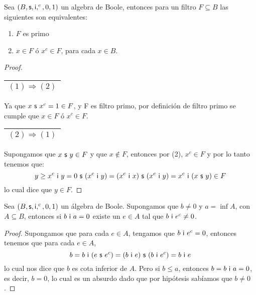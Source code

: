   \begin{lemma} \label{lemma_26}
    \PN Sea $(B, \mathsf{s}, \mathsf{i}, ^{c}, 0, 1)$ un algebra de Boole, entonces para un filtro $F \subseteq B$ las siguientes son equivalentes:
    \begin{enumerate}[(1)]
      \item $F$ es primo
      \item $x \in F$ ó $x^{c} \in F$, para cada $x \in B$.
    \end{enumerate}
  \end{lemma}
  \begin{proof}
    \begin{tabular}{|c|} \hline $(1) \Rightarrow (2)$\\\hline \end{tabular} Ya que $x \ \mathsf{s} \ x^{c} = 1 \in F$, y F es
      filtro primo, por definición de filtro primo se cumple que $x \in F$ ó $x^{c} \in F$.

    \vspace{3mm}
    \begin{tabular}{|c|} \hline $(2) \Rightarrow (1)$\\\hline \end{tabular} Supongamos que $x \ \mathsf{s} \ y \in F$ y que
    $x \notin F$, entonces por (2), $x^{c} \in F$ y por lo tanto tenemos que:
    \[
      y \geq x^{c} \ \IN \ y = 0 \ \SU \ (x^{c} \ \IN \ y) = (x^{c} \ \IN \ x) \ \SU \ (x^{c} \ \IN \ y) = x^{c} \ \IN \
      (x \ \SU \ y) \in F
    \]
    \PN lo cual dice que $y \in F$.
  \end{proof}

  \begin{lemma} \label{lemma_27}
    \PN Sea $(B, \mathsf{s}, \mathsf{i}, ^{c}, 0, 1)$ un álgebra de Boole. Supongamos que $b \neq 0$ y $a = \inf A$, con $A \subseteq B$, entonces si $b
    \ \mathsf{i} \ a = 0$ existe un $e \in A$ tal que $b \ \mathsf{i} \ e^{c} \neq 0$.
  \end{lemma}
  \begin{proof}
    \PN Supongamos que para cada $e \in A$, tengamos que $b \ \mathsf{i} \ e^{c} = 0$, entonces tenemos que para cada
    $e \in A$,
    \[
      b = b \ \mathsf{i} \ (e \ \mathsf{s} \ e^{c}) = (b \ \mathsf{i} \ e)\ \mathsf{s} \ (b \ \mathsf{i} \ e^{c}) = b \ \mathsf{i} \ e
    \]
    \PN lo cual nos dice que $b$ es cota inferior de $A$. Pero si $b \leq a$, entonces $b = b \ \mathsf{i} \ a = 0$, es decir,
    $b = 0$, lo cual es un absurdo dado que por hipótesis sabíamos que $b \neq 0$.
  \end{proof}

